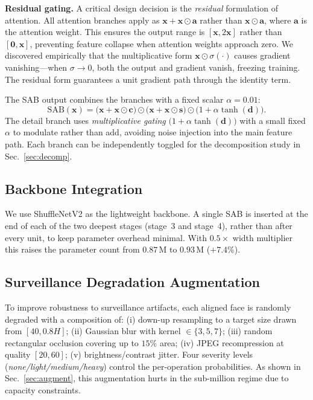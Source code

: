 \textbf{Residual gating.} A critical design decision is the \emph{residual} formulation of attention. All attention branches apply as $\mathbf{x} + \mathbf{x} \odot \mathbf{a}$ rather than $\mathbf{x} \odot \mathbf{a}$, where $\mathbf{a}$ is the attention weight. This ensures the output range is $[\mathbf{x}, 2\mathbf{x}]$ rather than $[\mathbf{0}, \mathbf{x}]$, preventing feature collapse when attention weights approach zero. We discovered empirically that the multiplicative form $\mathbf{x} \odot \sigma(\cdot)$ causes gradient vanishing---when $\sigma \to 0$, both the output and gradient vanish, freezing training. The residual form guarantees a unit gradient path through the identity term.

The SAB output combines the branches with a fixed scalar $\alpha{=}0.01$:
\begin{equation}
    \mathrm{SAB}(\mathbf{x}) = \big(\mathbf{x} + \mathbf{x} \odot \mathbf{c}\big) \odot \big(\mathbf{x} + \mathbf{x} \odot \mathbf{s}\big) \odot \big(1 + \alpha \tanh(\mathbf{d})\big).
    \label{eq:sab}
\end{equation}
The detail branch uses \emph{multiplicative gating} $\big(1 + \alpha \tanh(\mathbf{d})\big)$ with a small fixed $\alpha$ to modulate rather than add, avoiding noise injection into the main feature path. Each branch can be independently toggled for the decomposition study in Sec.~\ref{sec:decomp}.

\subsection{Backbone Integration}
\label{sec:backbone}

We use ShuffleNetV2 as the lightweight backbone. A single SAB is inserted at the end of each of the two deepest stages (stage~3 and stage~4), rather than after every unit, to keep parameter overhead minimal. With $0.5{\times}$ width multiplier this raises the parameter count from $0.87\,$M to $0.93\,$M ($+7.4\%$).

\subsection{Surveillance Degradation Augmentation}
\label{sec:aug}

To improve robustness to surveillance artifacts, each aligned face is randomly degraded with a composition of: (i) down-up resampling to a target size drawn from $[40, 0.8H]$; (ii) Gaussian blur with kernel $\in\{3,5,7\}$; (iii) random rectangular occlusion covering up to $15\%$ area; (iv) JPEG recompression at quality $[20,60]$; (v) brightness/contrast jitter. Four severity levels (\emph{none/light/medium/heavy}) control the per-operation probabilities. As shown in Sec.~\ref{sec:augment}, this augmentation hurts in the sub-million regime due to capacity constraints.

